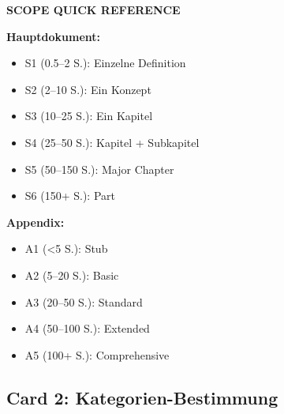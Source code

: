 \documentclass[12pt,a4paper]{article}
\begin{document}
\begin{tcolorbox}[colback=gray!10!white, colframe=black]
\textbf{SCOPE QUICK REFERENCE}

\textbf{Hauptdokument:}
\begin{itemize}[nosep]
\item S1 (0.5--2 S.): Einzelne Definition
\item S2 (2--10 S.): Ein Konzept
\item S3 (10--25 S.): Ein Kapitel
\item S4 (25--50 S.): Kapitel + Subkapitel
\item S5 (50--150 S.): Major Chapter
\item S6 (150+ S.): Part
\end{itemize}

\textbf{Appendix:}
\begin{itemize}[nosep]
\item A1 (<5 S.): Stub
\item A2 (5--20 S.): Basic
\item A3 (20--50 S.): Standard
\item A4 (50--100 S.): Extended
\item A5 (100+ S.): Comprehensive
\end{itemize}
\end{tcolorbox}

\subsection{Card 2: Kategorien-Bestimmung}
\end{document}

